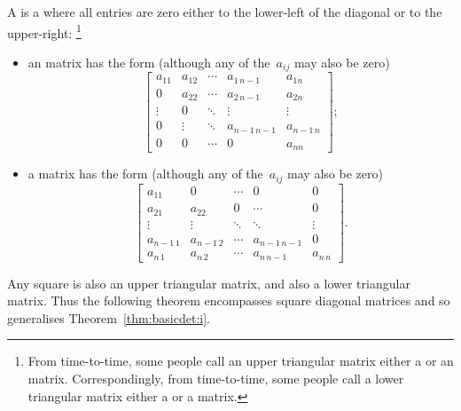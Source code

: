 \begin{definition} \label{def:trim}
A  is a  where all entries are zero either to the lower-left of the diagonal or to the upper-right:
\footnote{From time-to-time, some people call an upper triangular matrix either a  or an  matrix.  Correspondingly, from time-to-time, some people  call a lower triangular matrix either a  or a  matrix.}
\begin{itemize}
\item an  matrix has the form (although any of the~\(a_{ij}\) may also be zero)
\begin{equation*}
\begin{bmatrix} a_{11}&a_{12}&\cdots&a_{1\,n-1}&a_{1n}
\\0&a_{22}&\cdots&a_{2\,n-1} &a_{2n}
\\\vdots&0&\ddots&\vdots&\vdots
\\0&\vdots&\ddots&a_{n-1\,n-1}&a_{n-1\,n} 
\\0&0&\cdots&0&a_{nn} \end{bmatrix};
\end{equation*}

\item a  matrix has the form (although any of the~\(a_{ij}\) may also be zero)
\begin{equation*}
\begin{bmatrix} a_{11}&0&\cdots&0&0
\\a_{21}&a_{22}&0&\cdots &0
\\\vdots&\vdots&\ddots&\ddots&\vdots
\\a_{n-1\,1}&a_{n-1\,2}&\cdots&a_{n-1\,n-1}&0 
\\a_{n\,1}&a_{n\,2}&\cdots&a_{n\,n-1}&a_{n\,n} \end{bmatrix}.
\end{equation*}
\end{itemize}
\end{definition}


Any square  is also an upper triangular matrix, and also a lower triangular matrix.
Thus the following theorem encompasses square diagonal matrices and so generalises Theorem~\ref{thm:basicdet:i}.



